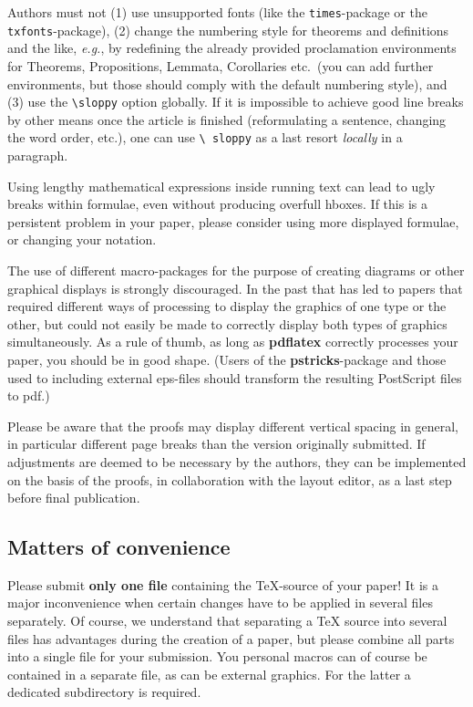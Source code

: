 \documentclass{CSLM} %
\theoremstyle{plain}\newtheorem{satz}[thm]{Satz} %
\def\eg{{\em e.g.}}
\begin{document}
  Authors must not (1) use unsupported fonts (like the
  \texttt{times}-package or the \texttt{txfonts}-package), (2) change
  the numbering style for theorems and definitions and the like, \eg,
  by redefining the already provided proclamation environments for
  Theorems, Propositions, Lemmata, Corollaries etc.\ (you can add
  further environments, but those should comply with the default
  numbering style), and (3) use the \texttt{\textbackslash sloppy}
  option globally.  If it is impossible to achieve good line breaks by
  other means once the article is finished (reformulating a sentence,
  changing the word order, etc.), one can use \texttt{\textbackslash
    sloppy} as a last resort \emph{locally} in a paragraph.

  Using lengthy mathematical expressions inside running text can lead
  to ugly breaks within formulae, even without producing overfull
  hboxes.  If this is a persistent problem in your paper, please
  consider using more displayed formulae, or changing your notation.

  The use of different macro-packages for the purpose of creating
  diagrams or other graphical displays is strongly discouraged.  In
  the past that has led to papers that required different ways of
  processing to display the graphics of one type or the other, but
  could not easily be made to correctly display both types of graphics
  simultaneously.  As a rule of thumb, as long as {\bf pdflatex}
  correctly processes your paper, you should be in good shape. (Users
  of the {\bf pstricks}-package and those used to including external
  eps-files should transform the resulting PostScript files to pdf.)

  Please be aware that the proofs may display different vertical
  spacing in general, in particular different page breaks than the
  version originally submitted.  If adjustments are deemed to be
  necessary by the authors, they can be implemented on the basis of
  the proofs, in collaboration with the layout editor, as a last step
  before final publication.
 
\subsection*{Matters of convenience}

  Please submit {\bf only one file} containing the
  TeX-source of your paper!  It is a major inconvenience when certain
  changes have to be applied in several files separately.  Of course,
  we understand that separating a TeX source into several files has
  advantages during the creation of a paper, but please combine all
  parts into a single file for your submission. You personal macros
  can of course be contained in a separate file, as can be external
  graphics.  For the latter a dedicated subdirectory is required.
\end{document}
